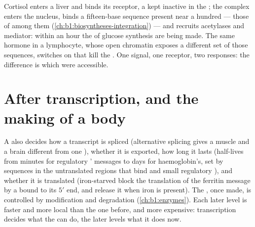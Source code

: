 \begin{example}\label{ex:b1:expression-control:steroid}
Cortisol enters a liver  and binds its receptor, a  kept inactive in the ; the complex enters the nucleus,
binds a fifteen-base sequence present near a hundred  --- those of
 among them (\cref{ch:b1:biosyntheses-integration}) ---
and recruits acetylases and mediator: within an hour the  of
glucose synthesis are being made. The same hormone in a lymphocyte,
whose open chromatin exposes a different set of those sequences,
switches on  that kill the . One signal, one receptor, two
responses: the difference is which  were accessible.
\end{example}

\section{After transcription, and the making of a body}

\begin{proposition}\label{prop:b1:expression-control:posttranscriptional}
A  also decides how a transcript is spliced
(alternative splicing gives a muscle and a brain different 
from one ), whether it is exported, how long it lasts (half-lives
from minutes for regulatory ' messages to days for
haemoglobin's, set by sequences in the untranslated regions that bind
 and small regulatory ), and whether it is translated
(iron-starved  block the translation of the ferritin message by a
 bound to its $5'$ end, and release it when iron is present).
The , once made, is controlled by modification and degradation
(\cref{ch:b1:enzymes}). Each later level is faster and more local
than the one before, and more expensive: transcription decides what
the  can do, the later levels what it does now.
\end{proposition}

